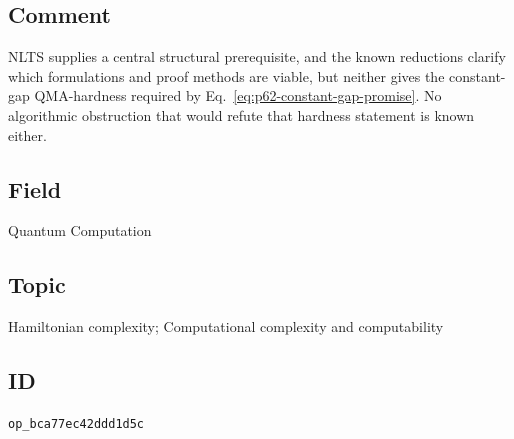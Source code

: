 \subsection*{Comment}

NLTS supplies a central structural prerequisite, and the known reductions
clarify which formulations and proof methods are viable, but neither gives
the constant-gap QMA-hardness required by
Eq.~\eqref{eq:p62-constant-gap-promise}.  No algorithmic obstruction that
would refute that hardness statement is known either.

\subsection*{Field}

Quantum Computation

\subsection*{Topic}

Hamiltonian complexity; Computational complexity and computability

\subsection*{ID}

\texttt{op\_bca77ec42ddd1d5c}
